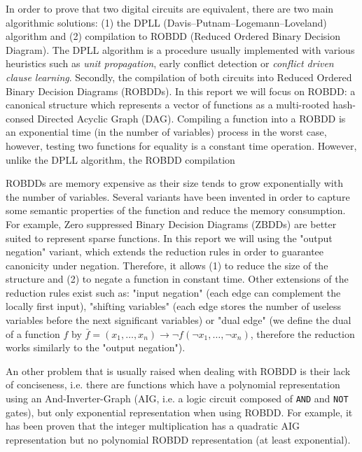 \documentclass[a4paper,10pt]{article}
\begin{document}
In order to prove that two digital circuits are equivalent, there are two main algorithmic solutions: (1) the DPLL (Davis–Putnam–Logemann–Loveland) algorithm and (2) compilation to ROBDD (Reduced Ordered Binary Decision Diagram).
The DPLL algorithm is a procedure usually implemented with various heuristics such as \textit{unit propagation}, early conflict detection or \textit{conflict driven clause learning}.
Secondly, the compilation of both circuits into Reduced Ordered Binary Decision Diagrams (ROBDDs).
In this report we will focus on ROBDD: a canonical structure which represents a vector of functions as a multi-rooted hash-consed Directed Acyclic Graph (DAG).
Compiling a function into a ROBDD is an exponential time (in the number of variables) process in the worst case, however, testing two functions for equality is a constant time operation.
However, unlike the DPLL algorithm, the ROBDD compilation

ROBDDs are memory expensive as their size tends to grow exponentially with the number of variables.
Several variants have been invented in order to capture some semantic properties of the function and reduce the memory consumption.
For example, Zero suppressed Binary Decision Diagrams (ZBDDs) are better suited to represent sparse functions.
In this report we will using the "output negation" variant\cite{BryantVariantN}, which extends the reduction rules in order to guarantee canonicity under negation.
Therefore, it allows (1) to reduce the size of the structure and (2) to negate a function in constant time.
Other extensions of the reduction rules exist such as: "input negation"\cite{MinatoVariants} (each edge can complement the locally first input), "shifting variables"\cite{MinatoVariants} (each edge stores the number of useless variables before the next significant variables) or "dual edge"\cite{RolfVariantDual} (we define the dual of a function $f$ by $\bar{f} = (x_1, \dots, x_n) \longrightarrow \lnot f(\lnot x_1, \dots, \lnot x_n)$, therefore the reduction works similarly to the "output negation").


An other problem that is usually raised when dealing with ROBDD is their lack of conciseness, i.e. there are functions which have a polynomial representation using an And-Inverter-Graph (AIG, i.e. a logic circuit composed of \texttt{AND} and \texttt{NOT} gates), but only exponential representation when using ROBDD.
For example, it has been proven \cite{Bryant1986} that the integer multiplication has a quadratic AIG representation but no polynomial ROBDD representation (at least exponential).
\end{document}
